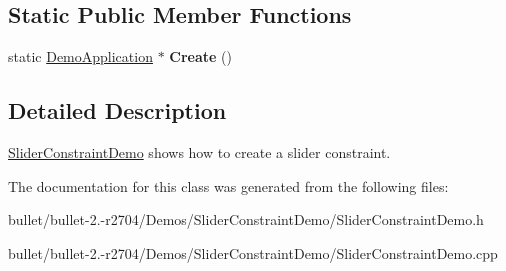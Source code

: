 \subsection*{Static Public Member Functions}
\begin{DoxyCompactItemize}
\item 
\hypertarget{class_slider_constraint_demo_ac14899418a620a6fd5d24c0cc12ad757}{static \hyperlink{class_demo_application}{Demo\+Application} $\ast$ {\bfseries Create} ()}\label{class_slider_constraint_demo_ac14899418a620a6fd5d24c0cc12ad757}

\end{DoxyCompactItemize}


\subsection{Detailed Description}
\hyperlink{class_slider_constraint_demo}{Slider\+Constraint\+Demo} shows how to create a slider constraint. 

The documentation for this class was generated from the following files\+:\begin{DoxyCompactItemize}
\item 
bullet/bullet-\/2.-\/r2704/\+Demos/\+Slider\+Constraint\+Demo/Slider\+Constraint\+Demo.\+h\item 
bullet/bullet-\/2.-\/r2704/\+Demos/\+Slider\+Constraint\+Demo/Slider\+Constraint\+Demo.\+cpp\end{DoxyCompactItemize}
